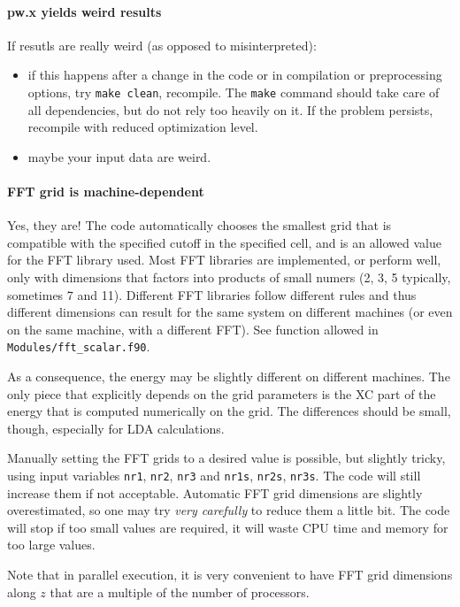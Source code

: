 \documentclass[12pt,a4paper]{article}
\begin{document}
\paragraph{pw.x yields weird results}
If resutls are really weird (as opposed to misinterpreted):
\begin{itemize}
\item if this happens after a change in the code or in compilation or
  preprocessing options, try \texttt{make clean}, recompile. The \texttt{make}
  command should take care of all dependencies, but do not rely too
  heavily on it. If the problem persists, recompile with
  reduced optimization level.  
\item maybe your input data are weird.
\end{itemize}

\paragraph{FFT grid is machine-dependent}
Yes, they are! The code automatically chooses the smallest grid that
is compatible with the 
specified cutoff in the specified cell, and is an allowed value for the FFT
library used. Most FFT libraries are implemented, or perform well, only
with dimensions that factors into products of small numers (2, 3, 5 typically,
sometimes 7 and 11). Different FFT libraries follow different rules and thus
different dimensions can result for the same system on different machines (or
even on the same machine, with a different FFT). See function allowed in
\texttt{Modules/fft\_scalar.f90}.

As a consequence, the energy may be slightly different on different machines. 
The only piece that explicitly depends on the grid parameters is
the XC part of the energy that is computed numerically on the grid. The
differences should be small, though, especially for LDA calculations.

Manually setting the FFT grids to a desired value is possible, but slightly
tricky, using input variables \texttt{nr1}, \texttt{nr2}, \texttt{nr3} and 
\texttt{nr1s}, \texttt{nr2s}, \texttt{nr3s}. The
code will still increase them if not acceptable. Automatic FFT grid 
dimensions are slightly overestimated, so one may try {\em very carefully}
to reduce
them a little bit. The code will stop if too small values are required, it will
waste CPU time and memory for too large values.
    
Note that in parallel execution, it is very convenient to have FFT grid
dimensions along $z$ that are a multiple of the number of processors.
\end{document}
